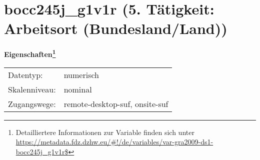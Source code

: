 
    \setcounter{footnote}{0}

    \vspace*{-1.8cm}
	\section{bocc245j\_g1v1r (5. Tätigkeit: Arbeitsort (Bundesland/Land))}
	\label{section:bocc245j_g1v1r}



    \vspace*{0.5cm}
    \noindent\textbf{Eigenschaften\footnote{Detailliertere Informationen zur Variable finden sich unter
		\url{https://metadata.fdz.dzhw.eu/\#!/de/variables/var-gra2009-ds1-bocc245j_g1v1r$}}}\\
	\begin{tabularx}{\hsize}{@{}lX}
	Datentyp: & numerisch \\
	Skalenniveau: & nominal \\
	Zugangswege: &
	  remote-desktop-suf, 
	  onsite-suf
 \\
    \end{tabularx}



